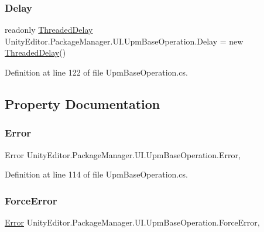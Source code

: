 \subsubsection{\texorpdfstring{Delay}{Delay}}
{\footnotesize\ttfamily readonly \mbox{\hyperlink{class_unity_editor_1_1_package_manager_1_1_u_i_1_1_threaded_delay}{Threaded\+Delay}} Unity\+Editor.\+Package\+Manager.\+U\+I.\+Upm\+Base\+Operation.\+Delay = new \mbox{\hyperlink{class_unity_editor_1_1_package_manager_1_1_u_i_1_1_threaded_delay}{Threaded\+Delay}}()}



Definition at line 122 of file Upm\+Base\+Operation.\+cs.



\subsection{Property Documentation}
\mbox{\label{class_unity_editor_1_1_package_manager_1_1_u_i_1_1_upm_base_operation_a116dcc466d587905084e826b47f7e05b}} 
\subsubsection{\texorpdfstring{Error}{Error}}
{\footnotesize\ttfamily Error Unity\+Editor.\+Package\+Manager.\+U\+I.\+Upm\+Base\+Operation.\+Error\hspace{0.3cm}{\ttfamily [get]}, {}}



Definition at line 114 of file Upm\+Base\+Operation.\+cs.

\mbox{\label{class_unity_editor_1_1_package_manager_1_1_u_i_1_1_upm_base_operation_a5d5284c292d559bf9d79f612d58a674c}} 
\subsubsection{\texorpdfstring{ForceError}{ForceError}}
{\footnotesize\ttfamily \mbox{\hyperlink{class_unity_editor_1_1_package_manager_1_1_u_i_1_1_upm_base_operation_a116dcc466d587905084e826b47f7e05b}{Error}} Unity\+Editor.\+Package\+Manager.\+U\+I.\+Upm\+Base\+Operation.\+Force\+Error\hspace{0.3cm}{\ttfamily [get]}, {\ttfamily [set]}}



